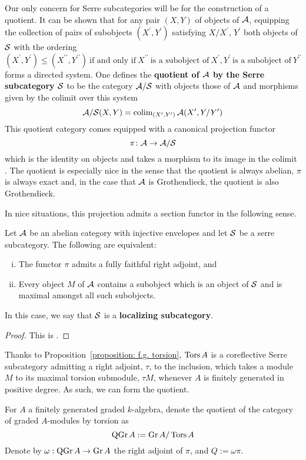 Our only concern for Serre subcategories will be for the construction of a quotient.
It can be shown that for any pair \((X,Y)\) of objects of \(\mathcal{A}\), equipping the collection of pairs of subobjects \((X^\prime, Y^\prime)\) satisfying \(X/X^\prime\), \(Y^\prime\) both objects of \(\mathcal{S}\) with the ordering
\[(X^\prime, Y^\prime) \leq (X^{\prime\prime}, Y^{\prime\prime})\
\text{if and only if}\
X^{\prime\prime}\
\text{is a subobject of}\
X^\prime,Y^\prime\
\text{is a subobject of}\
Y^{\prime\prime}\]
forms a directed system.
One defines the \textbf{quotient of \(\mathcal{A}\) by the Serre subcategory \(\mathcal{S}\)} to be the category \(\mathcal{A}/\mathcal{S}\) with objects those of \(\mathcal{A}\) and morphisms given by the colimit over this system
\[\mathcal{A}/\mathcal{S}(X,Y) = \operatorname{colim}_{(X^\prime, Y^\prime)} \mathcal{A}(X^\prime, Y/Y^\prime)\]
This quotient category comes equipped with a canonical projection functor
\[\pi \colon \mathcal{A} \to \mathcal{A}/\mathcal{S}\]
which is the identity on objects and takes a morphism to its image in the colimit \parencite[Cor. 1, III.1]{DCA62}.
The quotient is especially nice in the sense that the quotient is always abelian, \(\pi\) is always exact and, in the case that \(\mathcal{A}\) is Grothendieck, the quotient is also Grothendieck.

In nice situations, this projection admits a section functor in the following sense.

\begin{proposition}\label{prop: existence of serre functor}
  Let \(\mathcal{A}\) be an abelian category with injective envelopes and let \(\mathcal{S}\) be a serre subcategory.
  The following are equivalent:
  \begin{enumerate}[(i)]
  \item
    The functor \(\pi\) admits a fully faithful right adjoint, and
  \item
    Every object \(M\) of \(\mathcal{A}\) contains a subobject which is an object of \(\mathcal{S}\) and is maximal amongst all such subobjects.
  \end{enumerate}
  In this case, we say that \(\mathcal{S}\) is a \textbf{localizing subcategory}.
\end{proposition}

\begin{proof}
  This is \textcite[Cor. 1, III.3]{DCA62}.
\end{proof}

Thanks to Proposition~\ref{proposition: f.g. torsion}, \(\operatorname{Tors}A\) is a coreflective Serre subcategory admitting a right adjoint, \(\tau\), to the inclusion, which takes a module \(M\) to its maximal torsion submodule, \(\tau{M}\), whenever \(A\) is finitely generated in positive degree.
As such, we can form the quotient.
\begin{definition}
  For \(A\) a finitely generated graded \(k\)-algebra, denote the quotient of the category of graded \(A\)-modules by torsion as
  \begin{displaymath}
    \operatorname{QGr}A := \operatorname{Gr}A / \operatorname{Tors}A
  \end{displaymath}
  Denote by \(\omega : \operatorname{QGr}A \to \operatorname{Gr}A\) the right adjoint of \(\pi\), and \(Q := \omega\pi\).
\end{definition}

